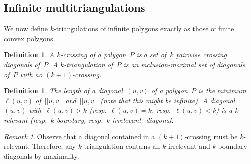 \documentclass{amsart}
\newtheorem{definition}[theorem]{Definition}
\theoremstyle{remark}
\newtheorem{remark}[theorem]{Remark}
\newcommand{\darkblue}{\color{darkblue}} %
\newcommand{\defn}[1]{\textsl{\darkblue #1}} %
\newcommand*{\ktg}[0]{$k$-triangulation\xspace}
\begin{document}

\subsection{Infinite multitriangulations}

We now define $k$-triangulations of infinite polygons exactly as those of finite convex polygons.

\begin{definition}
A \defn{$k$-crossing} of a polygon~$P$ is a set of~$k$ pairwise crossing diagonals of~$P$.
A \defn{$k$-triangulation} of~$P$ is an inclusion-maximal set of diagonals of~$P$ with no $(k+1)$-crossing.
\end{definition}

\begin{definition}
The \defn{length} of a diagonal~$(u,v)$ of a polygon~$P$ is the minimum~$\ell(u,v)$ of~$|{]u,v[}|$ and~$|{]u,v[}|$ (note that this might be infinite).
A diagonal~$(u,v)$ with~$\ell(u,v) > k$ (resp.~$\ell(u,v) = k$, resp.~$\ell(u,v) < k$) is a \defn{$k$-relevant} (resp.~\defn{$k$-boundary}, resp.~\defn{$k$-irrelevant}) diagonal.
\end{definition}

\begin{remark}
\label{rem:kboundary}
Observe that a diagonal contained in a $(k+1)$-crossing must be $k$-relevant.
Therefore, any \ktg contains all $k$-irrelevant and $k$-boundary diagonals by maximality.
\end{remark}
\end{document}
